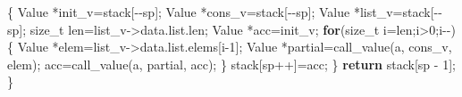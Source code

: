 \documentclass[]{article}
\newenvironment{Shaded}{}{}
\newcommand{\ControlFlowTok}[1]{\textcolor[rgb]{0.00,0.44,0.13}{\textbf{#1}}}
\newcommand{\DataTypeTok}[1]{\textcolor[rgb]{0.56,0.13,0.00}{#1}}
\newcommand{\DecValTok}[1]{\textcolor[rgb]{0.25,0.63,0.44}{#1}}
\newcommand{\NormalTok}[1]{#1}
\newcommand{\OperatorTok}[1]{\textcolor[rgb]{0.40,0.40,0.40}{#1}}
\begin{document}
\begin{Shaded}
\begin{Highlighting}[]
    \OperatorTok{\{}\NormalTok{ Value }\OperatorTok{*}\NormalTok{init\_v}\OperatorTok{=}\NormalTok{stack}\OperatorTok{[{-}{-}}\NormalTok{sp}\OperatorTok{];}\NormalTok{ Value }\OperatorTok{*}\NormalTok{cons\_v}\OperatorTok{=}\NormalTok{stack}\OperatorTok{[{-}{-}}\NormalTok{sp}\OperatorTok{];}\NormalTok{ Value }\OperatorTok{*}\NormalTok{list\_v}\OperatorTok{=}\NormalTok{stack}\OperatorTok{[{-}{-}}\NormalTok{sp}\OperatorTok{];}
      \DataTypeTok{size\_t}\NormalTok{ len}\OperatorTok{=}\NormalTok{list\_v}\OperatorTok{{-}\textgreater{}}\NormalTok{data}\OperatorTok{.}\NormalTok{list}\OperatorTok{.}\NormalTok{len}\OperatorTok{;}
\NormalTok{      Value }\OperatorTok{*}\NormalTok{acc}\OperatorTok{=}\NormalTok{init\_v}\OperatorTok{;}
      \ControlFlowTok{for}\OperatorTok{(}\DataTypeTok{size\_t}\NormalTok{ i}\OperatorTok{=}\NormalTok{len}\OperatorTok{;}\NormalTok{i}\OperatorTok{\textgreater{}}\DecValTok{0}\OperatorTok{;}\NormalTok{i}\OperatorTok{{-}{-})\{}
\NormalTok{        Value }\OperatorTok{*}\NormalTok{elem}\OperatorTok{=}\NormalTok{list\_v}\OperatorTok{{-}\textgreater{}}\NormalTok{data}\OperatorTok{.}\NormalTok{list}\OperatorTok{.}\NormalTok{elems}\OperatorTok{[}\NormalTok{i}\OperatorTok{{-}}\DecValTok{1}\OperatorTok{];}
\NormalTok{        Value }\OperatorTok{*}\NormalTok{partial}\OperatorTok{=}\NormalTok{call\_value}\OperatorTok{(}\NormalTok{a}\OperatorTok{,}\NormalTok{ cons\_v}\OperatorTok{,}\NormalTok{ elem}\OperatorTok{);}
\NormalTok{        acc}\OperatorTok{=}\NormalTok{call\_value}\OperatorTok{(}\NormalTok{a}\OperatorTok{,}\NormalTok{ partial}\OperatorTok{,}\NormalTok{ acc}\OperatorTok{);}
      \OperatorTok{\}}
\NormalTok{      stack}\OperatorTok{[}\NormalTok{sp}\OperatorTok{++]=}\NormalTok{acc}\OperatorTok{;} \OperatorTok{\}}
    \ControlFlowTok{return}\NormalTok{ stack}\OperatorTok{[}\NormalTok{sp }\OperatorTok{{-}} \DecValTok{1}\OperatorTok{];}
\OperatorTok{\}}


\end{Highlighting}
\end{Shaded}
\end{document}
